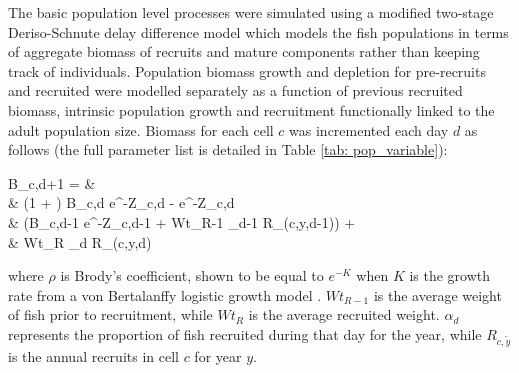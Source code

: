 \documentclass[review]{elsarticle}
\let\oldequation\equation
\let\oldendequation\endequation
\renewenvironment{equation}
 {\linenomathNonumbers\oldequation}
 {\oldendequation\endlinenomath}
\begin{document}
The basic population level processes were simulated using a modified two-stage
Deriso-Schnute delay difference model which models the fish populations in
terms of aggregate biomass of recruits and mature components rather than
keeping track of individuals\citep{Deriso1980, Schnute1985, Dichmont2003}.
 Population biomass growth and
depletion for pre-recruits and recruited
 were modelled separately as
a function of previous recruited biomass, intrinsic population growth and
recruitment functionally linked to the adult population size.  Biomass for each
cell $c$ was incremented each day $d$ as follows (the full parameter list is
detailed in Table \ref{tab: pop_variable}): 
\begin{equation}
	\begin{split}
	B_{c,d+1} = &\\
	& (1 + \rho) B_{c,d} \cdot e^{-Z_{c,d}} - \rho \cdot e^{-Z_{c,d}} \hspace{2.9cm}
	\times \\  
	& (B_{c,d-1} \cdot e^{-Z_{c,d-1}} + Wt_{R-1} \cdot \alpha_{d-1} \cdot
	R_{(c,y,d-1)})
	\hspace{0.4cm} + \\
	& Wt_{R} \cdot \alpha_{d} \cdot R_{(c,y,d)} 
	\end{split}
\end{equation}
where $\rho$ is Brody's coefficient, shown to be equal to $e^{-K}$ when $K$ is
the growth rate from a von Bertalanffy logistic growth model
\citep{Schnute1985}. $Wt_{R-1}$ is the average weight of fish prior to
recruitment, while $Wt_{R}$ is the average recruited weight. $\alpha_{d}$
represents the proportion of fish recruited during that day for the year, while
$R_{c,\tilde{y}}$ is the annual recruits in cell $c$ for year $y$. \\
\end{document}
